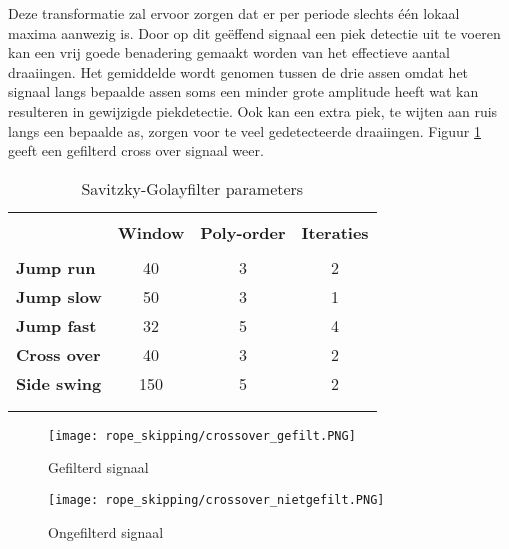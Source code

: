 Deze transformatie zal ervoor zorgen dat er per periode slechts één lokaal maxima aanwezig is. Door op dit geëffend signaal een piek detectie uit te voeren kan een vrij goede benadering gemaakt worden van het effectieve aantal draaiingen. Het gemiddelde wordt genomen tussen de drie assen omdat het signaal langs bepaalde assen soms een minder grote amplitude heeft wat kan resulteren in gewijzigde piekdetectie. Ook kan een extra piek, te wijten aan ruis langs een bepaalde as, zorgen voor te veel gedetecteerde draaiingen. Figuur \ref{fig:filter} geeft een gefilterd cross over signaal weer.

\begin{table}[!htpd]
  \centering
  \caption{Savitzky-Golayfilter parameters}
  \label{tab:filter}
\begin{tabular}{lccc}
 \hline \\
\textbf{}             & \textbf{Window} & \textbf{Poly-order } & \textbf{Iteraties} &  \\
\hline \\
\textbf{Jump run}     & 40               & 3            & 2        &  \\
\textbf{Jump slow}    & 50              & 3            & 1        &  \\
\textbf{Jump fast}    & 32               & 5            & 4        &  \\
\textbf{Cross over}   & 40               & 3               & 2        &  \\
\textbf{Side swing}   & 150                  & 5            & 2       & \\\\
\hline \\
\end{tabular}
\end{table}

\begin{figure}[!htpd]
\centering
\caption{Gefilterd signaal}\label{fig:filter}
\texttt{[image: rope\_skipping/crossover\_gefilt.PNG]} 
\end{figure}

\begin{figure}[!htpd]
\centering
\caption{Ongefilterd signaal}\label{fig:nofilter}
\texttt{[image: rope\_skipping/crossover\_nietgefilt.PNG]} 
\end{figure}

